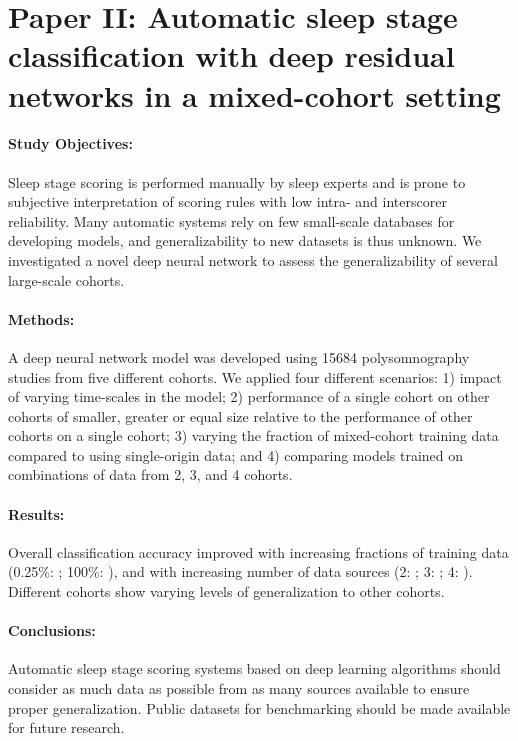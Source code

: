 \section{Paper II: Automatic sleep stage classification with deep residual networks in a mixed-cohort setting}\label{sec:paperii}

\begin{tcolorbox}[colframe=white]
\paragraph{Study Objectives:} Sleep stage scoring is performed manually by sleep experts and is prone to subjective interpretation of scoring rules with low intra- and interscorer reliability. 
Many automatic systems rely on few small-scale databases for developing models, and generalizability to new datasets is thus unknown. 
We investigated a novel deep neural network to assess the generalizability of several large-scale cohorts.
\paragraph{Methods:} A deep neural network model was developed using \num{15684} polysomnography studies from five different cohorts. 
We applied four different scenarios: 1) impact of varying time-scales in the model; 2) performance of a single cohort on other cohorts of smaller, greater or equal size relative to the performance of other cohorts on a single cohort; 3) varying the fraction of mixed-cohort training data compared to using single-origin data; and 4) comparing models trained on combinations of data from 2, 3, and 4 cohorts.
\paragraph{Results:} Overall classification accuracy improved with increasing fractions of training data (0.25\%: ; 100\%: ), and with increasing number of data sources (2: ; 3: ; 4: ). 
Different cohorts show varying levels of generalization to other cohorts.
\paragraph{Conclusions:} Automatic sleep stage scoring systems based on deep learning algorithms should consider as much data as possible from as many sources available to ensure proper generalization. 
Public datasets for benchmarking should be made available for future research.
\end{tcolorbox}



